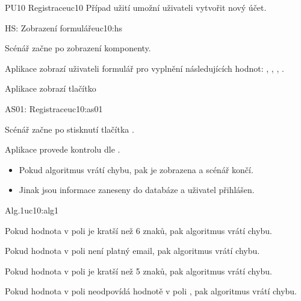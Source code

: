 \begin{usecase}{PU10 Registrace}{uc10}
    Případ užití umožní uživateli vytvořit nový účet.

    \begin{scenario}{HS: Zobrazení formuláře}{uc10:hs}
        \item Scénář začne po zobrazení komponenty.
        \item Aplikace zobrazí uživateli formulář pro vyplnění následujících hodnot: , , , .
        \item Aplikace zobrazí tlačítko 
    \end{scenario}

    \begin{scenario}{AS01: Registrace}{uc10:as01}
        \item Scénář začne po stisknutí tlačítka .
        \item Aplikace provede kontrolu dle .
        \begin{itemize}
            \item Pokud algoritmus vrátí chybu, pak je zobrazena a scénář končí.
            \item Jinak jsou informace zaneseny do databáze a uživatel přihlášen.
        \end{itemize}
    \end{scenario}
    
    \begin{scenario}{Alg.1}{uc10:alg1}
        \item Pokud hodnota v poli  je kratší než 6 znaků, pak algoritmus vrátí chybu.
        \item Pokud hodnota v poli  není platný email, pak algoritmus vrátí chybu.
        \item Pokud hodnota v poli  je kratší než 5 znaků, pak algoritmus vrátí chybu.
        \item Pokud hodnota v poli  neodpovídá hodnotě v poli , pak algoritmus vrátí chybu.
    \end{scenario}
\end{usecase}